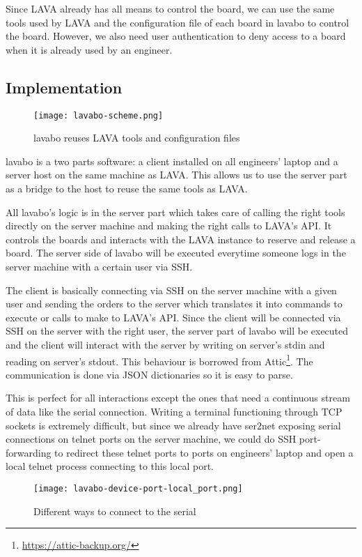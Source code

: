 Since LAVA already has all means to control the board, we can use the same tools used by LAVA and the configuration file of each board in lavabo to control the board. However, we also need user authentication to deny access to a board when it is already used by an engineer.

\subsection{Implementation}

\begin{figure}[H]
  \texttt{[image: lavabo-scheme.png]}
  \caption{lavabo reuses LAVA tools and configuration files}
\end{figure}

lavabo is a two parts software: a client installed on all engineers' laptop and a server host on the same machine as LAVA. This allows us to use the server part as a bridge to the host to reuse the same tools as LAVA.

All lavabo's logic is in the server part which takes care of calling the right tools directly on the server machine and making the right calls to LAVA's API. It controls the boards and interacts with the LAVA instance to reserve and release a board. The server side of lavabo will be executed everytime someone logs in the server machine with a certain user via SSH.

The client is basically connecting via SSH on the server machine with a given user and sending the orders to the server which translates it into commands to execute or calls to make to LAVA's API. Since the client will be connected via SSH on the server with the right user, the server part of lavabo will be executed and the client will interact with the server by writing on server's stdin and reading on server's stdout. This behaviour is borrowed from Attic\footnote{\url{https://attic-backup.org/}}. The communication is done via JSON dictionaries so it is easy to parse.

This is perfect for all interactions except the ones that need a continuous stream of data like the serial connection. Writing a terminal functioning through TCP sockets is extremely difficult, but since we already have ser2net exposing serial connections on telnet ports on the server machine, we could do SSH port-forwarding to redirect these telnet ports to ports on engineers' laptop and open a local telnet process connecting to this local port.

\begin{figure}[H]
  \texttt{[image: lavabo-device-port-local\_port.png]}
  \caption{Different ways to connect to the serial}
\end{figure}

